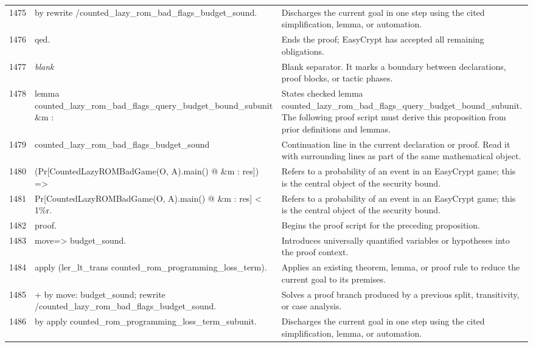 \documentclass[10pt]{article}
\begin{document}
\begin{longtable}{r L{0.53\textwidth} L{0.37\textwidth}}
1475 & {\ttfamily\scriptsize by rewrite /counted\_lazy\_rom\_bad\_flags\_budget\_sound.} & Discharges the current goal in one step using the cited simplification, lemma, or automation. \\
1476 & {\ttfamily\scriptsize qed.} & Ends the proof; EasyCrypt has accepted all remaining obligations. \\
1477 & {\ttfamily\scriptsize \emph{blank}} & Blank separator.  It marks a boundary between declarations, proof blocks, or tactic phases. \\
1478 & {\ttfamily\scriptsize lemma counted\_lazy\_rom\_bad\_flags\_query\_budget\_bound\_subunit \&m :} & States checked lemma counted\_lazy\_rom\_bad\_flags\_query\_budget\_bound\_subunit.  The following proof script must derive this proposition from prior definitions and lemmas. \\
1479 & {\ttfamily\scriptsize   counted\_lazy\_rom\_bad\_flags\_budget\_sound} & Continuation line in the current declaration or proof.  Read it with surrounding lines as part of the same mathematical object. \\
1480 & {\ttfamily\scriptsize     (Pr[CountedLazyROMBadGame(O, A).main() @ \&m : res]) =>} & Refers to a probability of an event in an EasyCrypt game; this is the central object of the security bound. \\
1481 & {\ttfamily\scriptsize   Pr[CountedLazyROMBadGame(O, A).main() @ \&m : res] < 1\%r.} & Refers to a probability of an event in an EasyCrypt game; this is the central object of the security bound. \\
1482 & {\ttfamily\scriptsize proof.} & Begins the proof script for the preceding proposition. \\
1483 & {\ttfamily\scriptsize move=> budget\_sound.} & Introduces universally quantified variables or hypotheses into the proof context. \\
1484 & {\ttfamily\scriptsize apply (ler\_lt\_trans counted\_rom\_programming\_loss\_term).} & Applies an existing theorem, lemma, or proof rule to reduce the current goal to its premises. \\
1485 & {\ttfamily\scriptsize + by move: budget\_sound; rewrite /counted\_lazy\_rom\_bad\_flags\_budget\_sound.} & Solves a proof branch produced by a previous split, transitivity, or case analysis. \\
1486 & {\ttfamily\scriptsize by apply counted\_rom\_programming\_loss\_term\_subunit.} & Discharges the current goal in one step using the cited simplification, lemma, or automation. \\

\end{longtable}
\end{document}
